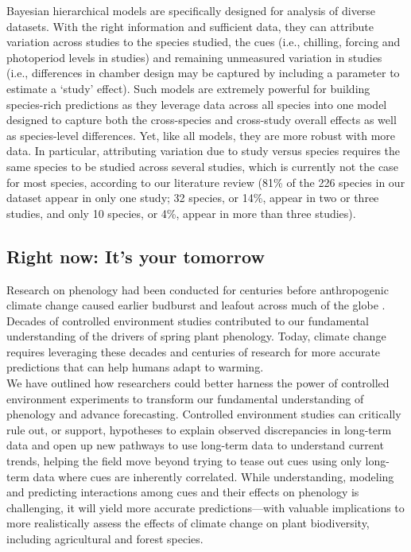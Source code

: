 \documentclass[11pt,letter]{article}
\begin{document}
Bayesian hierarchical models are specifically designed for analysis of diverse datasets. With the right information and sufficient data, they can attribute variation across studies to the species studied, the cues (i.e., chilling, forcing and photoperiod levels in studies) and remaining unmeasured variation in studies (i.e., differences in chamber design may be captured by including a parameter to estimate a `study' effect). Such models are extremely powerful for building species-rich predictions as they leverage data across all species into one model designed to capture both the cross-species and cross-study overall effects as well as species-level differences. Yet, like all models, they are more robust with more data. In particular, attributing variation due to study versus species requires the same species to be studied across several studies, which is currently not the case for most species, according to our literature review (81\% of the 226 species in our dataset appear in only one study; 32 species, or 14\%, appear in two or  three studies, and only 10 species, or 4\%, appear in more than three studies). %

\subsection{Right now: It's your tomorrow}
Research on phenology had been conducted for centuries before anthropogenic climate change caused earlier budburst and leafout across much of the globe \citep{Lamb:1948aa,Sparks:1995mv}. Decades of controlled environment studies contributed to our fundamental understanding of the drivers of spring plant phenology. Today, climate change requires leveraging these decades and centuries of research for more accurate predictions that can help humans adapt to warming. \\

We have outlined how researchers could better harness the power of controlled environment experiments to transform our fundamental understanding of phenology and advance forecasting. Controlled environment studies can critically rule out, or support, hypotheses to explain observed discrepancies in long-term data and open up new pathways to use long-term data to understand current trends, helping the field move beyond trying to tease out cues using only long-term data where cues are inherently correlated. While understanding, modeling and predicting interactions among cues and their effects on phenology is challenging, it will yield more accurate predictions---with valuable implications to more realistically assess the effects of climate change on plant biodiversity, including agricultural and forest species. 
\end{document}
